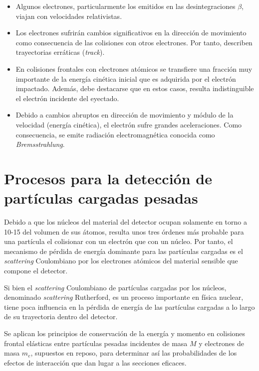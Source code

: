 \begin{itemize}
 \item Algunos electrones, particularmente los emitidos en las desintegraciones $\beta$, viajan con velocidades relativistas.
 \item Los electrones sufrir\'an cambios significativos en la direcci\'on de movimiento como consecuencia de las colisiones con otros 
 electrones. Por tanto, describen trayectorias err\'aticas (\textit{track}). 
 \item En colisiones frontales con electrones at\'omicos se transfiere una fracci\'on muy importante de la energ\'ia cin\'etica inicial 
 que es adquirida por el electr\'on impactado. Adem\'as, debe destacarse que en estos casos, resulta indistinguible el electr\'on 
 incidente del eyectado.
 \item Debido a cambios abruptos en direcci\'on de movimiento y m\'odulo de la velocidad (energ\'ia cin\'etica), el electr\'on 
 sufre grandes aceleraciones. Como consecuencia, se emite radiaci\'on electromagn\'etica conocida como \textit{Bremsstrahlung}.
\end{itemize}


\section{Procesos para la detecci\'on de part\'iculas cargadas pesadas}
\label{CapIII_4}

Debido a que los n\'ucleos del material del detector ocupan solamente en torno a 10-15 del volumen de sus \'atomos, resulta unos tres 
\'ordenes m\'as probable para una part\'icula el colisionar con un electr\'on que con un n\'ucleo. Por tanto, el mecanismo de p\'erdida 
de energ\'ia dominante para las part\'iculas cargadas es el \textit{scattering} Coulombiano por los electrones at\'omicos del material 
sensible que compone el detector.
%

%
Si bien el \textit{scattering} Coulombiano de part\'iculas cargadas por los n\'ucleos, denominado \textit{scattering} Rutherford, es un 
proceso importante en f\'isica nuclear, tiene poca influencia en la p\'erdida de energ\'ia de las part\'iculas cargadas a lo largo de su 
trayectoria dentro del detector. 
%

%
Se aplican los principios de conservaci\'on de la energ\'ia y momento en colisiones frontal el\'asticas entre part\'iculas pesadas 
incidentes de masa $M$ y electrones de masa $m_{e}$, supuestos en reposo, para determinar as\'i las probabilidades de los efectos de 
interacci\'on que dan lugar a las secciones eficaces.
%

